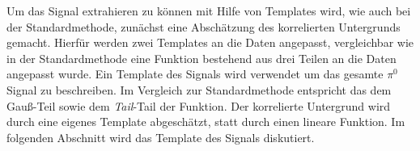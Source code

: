 Um das Signal extrahieren zu können mit Hilfe von Templates wird, wie auch bei der Standardmethode, zunächst eine Abschätzung des korrelierten Untergrunds gemacht.
Hierfür werden zwei Templates an die Daten angepasst, vergleichbar wie in der Standardmethode eine Funktion bestehend aus drei Teilen an die Daten angepasst wurde.
Ein Template des Signals wird verwendet um das gesamte $\pi^{0}$ Signal zu beschreiben.
Im Vergleich zur Standardmethode entspricht das dem Gau{\ss}-Teil sowie dem \textit{Tail}-Tail der Funktion.
Der korrelierte Untergrund wird durch eine eigenes Template abgeschätzt, statt durch einen lineare Funktion.
\newline
Im folgenden Abschnitt wird das Template des Signals diskutiert. 